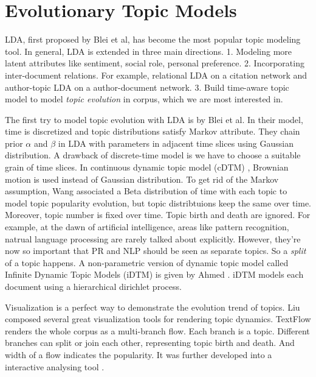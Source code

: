 \documentclass{article}
\begin{document}
\section {Evolutionary Topic Models}
LDA, first proposed by Blei et al,\cite{blei2003latent} has become the most popular topic modeling tool. In general, LDA is extended in three main directions. 1. Modeling more latent attributes like sentiment, social role, personal preference. 2. Incorporating inter-document relations. For example, relational LDA\cite{chang2009relational} on a citation network and author-topic LDA\cite{rosen2004author} on a author-document network. 3. Build time-aware topic model to model {\em topic evolution} in corpus, which we are most interested in.

The first try to model topic evolution with LDA is by Blei et al\cite{blei2006dynamic}. In their model, time is discretized and topic distributions satisfy Markov attribute. They chain prior $\alpha$ and $\beta$ in LDA with parameters in adjacent time slices using Gaussian distribution. A drawback of discrete-time model is we have to choose a suitable grain of time slices. In continuous dynamic topic model (cDTM) \cite{wang2012continuous}, Brownian motion is used instead of Gaussian distribution. To get rid of the Markov assumption, Wang \cite{wang2006topics} associated a Beta distribution of time with each topic to model topic popularity evolution, but topic distribtuions keep the same over time. Moreover, topic number is fixed over time. Topic birth and death are ignored. For example, at the dawn of artificial intelligence, areas like pattern recognition, natrual language processing are rarely talked about explicitly. However, they're now so important that PR and NLP should be seen as separate topics. So a {\em split} of a topic happens. A non-parametric version of dynamic topic model called Infinite Dynamic Topic Models (iDTM) is given by Ahmed \cite{ahmed2012timeline}. iDTM models each document using a hierarchical dirichlet process.

Visualization is a perfect way to demonstrate the evolution trend of topics. Liu composed several great visualization tools for rendering topic dynamics. TextFlow \cite{cui2011textflow} renders the whole corpus as a multi-branch flow. Each branch is a topic. Different branches can split or join each other, representing topic birth and death. And width of a flow indicates the popularity. It was further developed into a interactive analysing tool \cite{liu2009interactive}.
\end{document}
